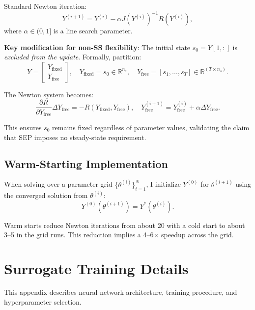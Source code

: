 \documentclass[12pt]{article}
\theoremstyle{plain}
\theoremstyle{definition}
\theoremstyle{remark}
\newcommand{\R}{\mathbb{R}}
\begin{document}
Standard Newton iteration:
\begin{equation}
Y^{(i+1)} = Y^{(i)} - \alpha J(Y^{(i)})^{-1} R(Y^{(i)}),
\end{equation}
where $\alpha \in (0,1]$ is a line search parameter.

\textbf{Key modification for non-SS flexibility}: The initial state $s_0 = Y[1,:]$ is \emph{excluded from the update}. Formally, partition:
\begin{equation}
Y = \begin{bmatrix} Y_{\text{fixed}} \\ Y_{\text{free}} \end{bmatrix}, \quad Y_{\text{fixed}} = s_0 \in \R^{n_s}, \quad Y_{\text{free}} = [s_1, \ldots, s_T] \in \R^{(T \times n_s)}.
\end{equation}

The Newton system becomes:
\begin{equation}
\frac{\partial R}{\partial Y_{\text{free}}} \Delta Y_{\text{free}} = -R(Y_{\text{fixed}}, Y_{\text{free}}), \quad Y_{\text{free}}^{(i+1)} = Y_{\text{free}}^{(i)} + \alpha \Delta Y_{\text{free}}.
\end{equation}

This ensures $s_0$ remains fixed regardless of parameter values, validating the claim that SEP imposes no steady-state requirement.


\subsection{Warm-Starting Implementation}

When solving over a parameter grid $\{\theta^{(i)}\}_{i=1}^N$, I initialize $Y^{(0)}$ for $\theta^{(i+1)}$ using the converged solution from $\theta^{(i)}$:
\begin{equation}
Y^{(0)}(\theta^{(i+1)}) = Y^*(\theta^{(i)}).
\end{equation}

Warm starts reduce Newton iterations from about 20 with a cold start to about 3--5 in the grid runs. This reduction implies a 4--6$\times$ speedup across the grid.


\section{Surrogate Training Details}
\label{app:surrogate}

This appendix describes neural network architecture, training procedure, and hyperparameter selection.
\end{document}
